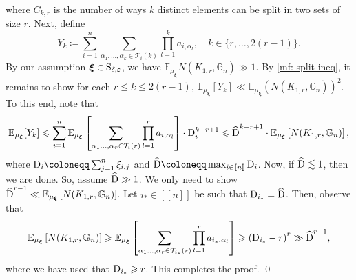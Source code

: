 \documentclass[a4paper,11pt,english,reqno]{amsart}
\numberwithin{equation}{section}
\renewcommand{\leq}{\leqslant}
\renewcommand{\geq}{\geqslant}
\newcommand{\T}{\mathcal{T}}
\newcommand{\E}{\mathbb{E}}
\newcommand{\G}{\mathbb{G}}
\newcommand{\tu}[1]{\textup{#1}}
\newcommand{\set}[1]{[\![#1]\!]}
\begin{document}
where $C_{k,r}$ is the number of ways $k$ distinct elements can be split in two sets of size $r$. %
Next, define
\begin{equation*}
	Y_{k}\coloneqq \sum_{i=1}^{n}\sum_{\alpha_1, \ldots, \alpha_{k}\in \T_{i}(k)}\prod_{l=1}^{k}a_{i, \alpha_l}, \quad k\in \{r, \ldots, 2(r-1)\}.
\end{equation*} 
By our assumption $\boldsymbol{\xi}\in \tu{S}_{\delta, \varepsilon}$, we have $\E_{\mu_{\boldsymbol{\xi}}}N(K_{1,r}, \G_n)\gg 1$. By \eqref{mf: split ineq}, it remains to show for each $r\leq k\leq 2(r-1)$, $\E_{\mu_{\boldsymbol{\xi}}}\left[Y_k\right]\ll \E_{\mu_{\boldsymbol{\xi}}}\left(N(K_{1,r}, \G_n)\right)^{2}$. To this end, note that %
\begin{equation}
	\label{mf: max ineq}
	\E_{\mu_{\boldsymbol{\xi}}}[Y_k]\leq \sum_{i=1}^{n}\E_{\mu_{\boldsymbol{\xi}}}\left[\sum_{\alpha_{1}\ldots, \alpha_{r}\in \T_{i}(r)}\prod_{l=1}^{r}a_{i,\alpha_l}\right]\cdot \tu{D}_{i}^{k-r+1}\leq \widehat{\tu{D}}^{k-r+1}\cdot \E_{\mu_{\boldsymbol{\xi}}}\left[N(K_{1,r}, \G_n)\right],
\end{equation}
where $\tu{D}_{i}\coloneqq \sum_{j=1}^n\xi_{i,j}$ and $\widehat{\tu{D}}\coloneqq \max_{i\in \set{n}} \tu{D}_
i$. Now, if $\widehat{\tu{D}}\lesssim 1$, then we are done. So, assume $\widehat{\tu{D}}\gg 1$. We only need to show $\widehat{\tu{D}}^{r-1}\ll \E_{\mu_{\boldsymbol{\xi}}} \left[N(K_{1,r}, \G_n)\right]$. Let $i_*\in \set{n}$ be such that $\tu{D}_{i_*}=\widehat{\tu{D}}$. Then, observe that 
\begin{equation*}
	\E_{\mu_{\boldsymbol{\xi}}} \left[N(K_{1,r}, \G_n)\right]\geq \E_{\mu_{\boldsymbol{\xi}}}\left[\sum_{\alpha_{1}\ldots, \alpha_{r}\in \T_{i_{*}}(r)}\prod_{l=1}^{r}a_{i_{*},\alpha_l}\right] \geq \left(\tu{D}_{i_{*}}-r\right)^{r} \gg \widehat{\tu{D}}^{r-1},
\end{equation*}
where we have used that $\tu{D}_{i_{*}}\geq r$. This completes the proof.
\qed





\end{document}
